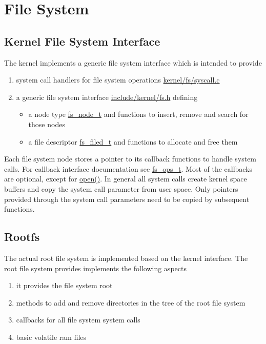 \section{File System}
	\subsection{Kernel File System Interface}
		The kernel implements a generic file system interface which is intended to provide
		\begin{enumerate}
			\item system call handlers for file system operations \hyperref[kernel_2fs_2syscall_8c]{kernel/fs/syscall.c}
			\item a generic file system interface \hyperref[fs_8h]{include/kernel/fs.h} defining
				\begin{itemize}
					\item a node type \hyperref[structfs__node__t]{fs\_node\_t} and functions to insert, remove and search for those nodes
					\item a file descriptor \hyperref[structfs__filed__t]{fs\_filed\_t} and functions to allocate and free them
				\end{itemize}
		\end{enumerate}

		Each file system node stores a pointer to its callback functions to handle system calls. For callback interface documentation see \hyperref[structfs__ops__t]{fs\_ops\_t}. Most of the callbacks are optional, except for \hyperref[structfs__ops__t_a0ea05ccab180719ed0f32631d5ad71bf]{open()}.
		In general all system calls create kernel space buffers and copy the system call parameter from user space. Only pointers provided through the system call parameters need to be copied by subsequent functions.

	\subsection{Rootfs}
		The actual root file system is implemented based on the kernel interface. The root file system provides implements the following aspects
		\begin{enumerate}
			\item it provides the file system root
			\item methods to add and remove directories in the tree of the root file system
			\item callbacks for all file system system calls
			\item basic volatile ram files
		\end{enumerate}


